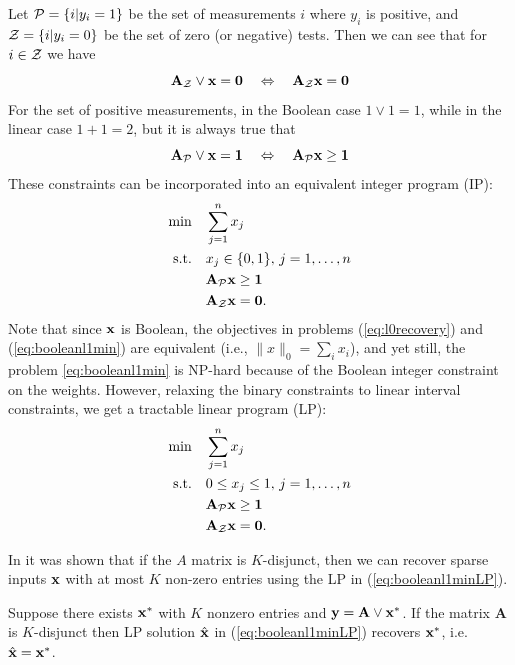 Let $\mathcal{P}= \{i | y_i = 1\}$ be the set of measurements $i$ where $y_i$ is positive,
and $\mathcal{Z} = \{i | y_i = 0\}$ be the set of zero (or negative) tests. Then we can
see that for $i \in \mathcal{Z}$ we have
\begin{equation}
\mathbf{A}_{\mathcal{Z}}\lor\mathbf{x} = \mathbf{0} ~~~\Leftrightarrow~~~ \mathbf{A}_{\mathcal{Z}}\mathbf{x} = \mathbf{0}
\end{equation}
For the set of positive measurements, in the Boolean case $1\lor 1 = 1$, while
in the linear case $1 + 1 = 2$, but it is always true that
\begin{equation}
\mathbf{A}_{\mathcal{P}}\lor\mathbf{x} =\mathbf{1} ~~~\Leftrightarrow~~~ \mathbf{A}_{\mathcal{P}}\mathbf{x} \ge \mathbf{1}
\end{equation}
These constraints can be incorporated into an equivalent integer program (IP):
\begin{align}
\label{eq:booleanl1min}
	\min\quad &\sum_{j=1}^{n} x_j \\
	\textrm{s.t.\quad} & x_j \in \{0,1\},\,j = 1,\ldots,n\nonumber\\
		& \mathbf{A}_{\mathcal{P}}\mathbf{x} \ge \mathbf{1}\nonumber\\
		& \mathbf{A}_{\mathcal{Z}}\mathbf{x} = \mathbf{0}.\nonumber
\end{align}
Note that since $\mathbf{x}$ is Boolean, the objectives in problems (\ref{eq:l0recovery}) and (\ref{eq:booleanl1min}) are equivalent (i.e., $\|x\|_0=\sum_i{x_i}$), and yet still, the problem
\eqref{eq:booleanl1min} is NP-hard because of the Boolean integer constraint on the weights. However, relaxing the binary constraints to linear interval constraints, we get a tractable linear program (LP):
\begin{align}
\label{eq:booleanl1minLP}
	\min\quad &\sum_{j=1}^{n} x_j \\
	\textrm{s.t.\quad} & 0\leq x_j \leq 1, \,j = 1,\ldots,n\nonumber\\
		& \mathbf{A}_{\mathcal{P}}\mathbf{x} \ge \mathbf{1}\nonumber\\
		& \mathbf{A}_{\mathcal{Z}}\mathbf{x} = \mathbf{0}.\nonumber
\end{align}

In \cite{MalioutovM2012} it was shown that if the $A$ matrix is $K$-disjunct, 
then we can recover sparse inputs $\mathbf{x}$ with at most $K$ non-zero entries using 
the LP in (\ref{eq:booleanl1minLP}).
\begin{theorem}
\label{thm:LP_recovery}
Suppose there exists $\mathbf{x}^*$ with $K$ nonzero entries and
$\mathbf{y} = \mathbf{A} \lor \mathbf{x}^*$. If the matrix $\mathbf{A}$ is $K$-disjunct then
LP solution $\hat{\mathbf{x}}$ in (\ref{eq:booleanl1minLP}) recovers $\mathbf{x}^*$, i.e. $\hat{\mathbf{x}} = \mathbf{x}^*$.
\end{theorem}

